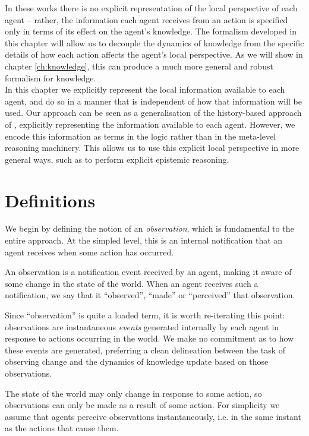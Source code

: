 In these works there is no explicit representation of the local perspective
of each agent -- rather, the information each agent receives from
an action is specified only in terms of its effect on the agent's
knowledge. The formalism developed in this chapter will allow us to
decouple the dynamics of knowledge from the specific details of how
each action affects the agent's local perspective. As we will show
in chapter \ref{ch:knowledge}, this can produce a much more general
and robust formalism for knowledge.\\


In this chapter we explicitly represent the local information available
to each agent, and do so in a manner that is independent of how that
information will be used. Our approach can be seen as a generalisation
of the history-based approach of \citep{giacomo99indigolog}, explicitly
representing the information available to each agent. However, we
encode this information as terms in the logic rather than in the meta-level
reasoning machinery. This allows us to use this explicit local perspective
in more general ways, such as to perform explicit epistemic reasoning.


\section{Definitions\label{sec:Observations:Definitions}}

We begin by defining the notion of an \emph{observation}, which is
fundamental to the entire approach\emph{.} At the simpled level, this
is an internal notification that an agent receives when some action
has occurred.

\begin{defnL}
[{Observations}] An observation is a notification event received
by an agent, making it aware of some change in the state of the world.
When an agent receives such a notification, we say that it {}``observed'',
{}``made'' or {}``perceived'' that observation. 
\end{defnL}
Since {}``observation'' is quite a loaded term, it is worth re-iterating
this point: observations are instantaneous \emph{events} generated
internally by each agent in response to actions occurring in the world.
We make no commitment as to how these events are generated, preferring
a clean delineation between the task of observing change and the dynamics
of knowledge update based on those observations.

The state of the world may only change in response to some action,
so observations can only be made as a result of some action. For simplicity
we assume that agents perceive observations instantaneously, i.e.
in the same instant as the actions that cause them.

